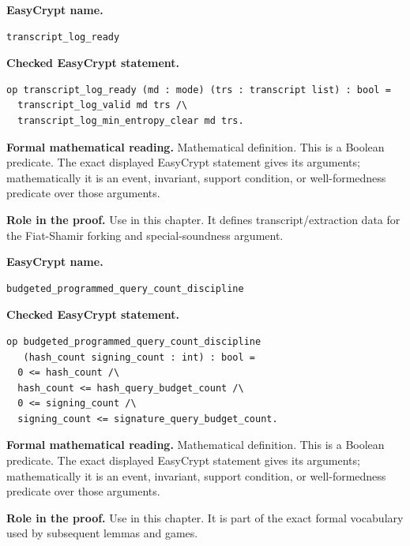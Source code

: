 \begin{formaldefinition}
\noindent\textbf{EasyCrypt name.}
\begin{lstlisting}[language=EasyCrypt,basicstyle=\ttfamily\scriptsize]
transcript_log_ready
\end{lstlisting}
\noindent\textbf{Checked EasyCrypt statement.}
\begin{lstlisting}[language=EasyCrypt,basicstyle=\ttfamily\scriptsize]
op transcript_log_ready (md : mode) (trs : transcript list) : bool =
  transcript_log_valid md trs /\
  transcript_log_min_entropy_clear md trs.
\end{lstlisting}
\noindent\textbf{Formal mathematical reading.}
Mathematical definition. This is a Boolean predicate.  The exact displayed EasyCrypt statement gives its arguments; mathematically it is an event, invariant, support condition, or well-formedness predicate over those arguments.

\noindent\textbf{Role in the proof.}
Use in this chapter. It defines transcript/extraction data for the Fiat-Shamir forking and special-soundness argument.

\end{formaldefinition}

\begin{formaldefinition}
\noindent\textbf{EasyCrypt name.}
\begin{lstlisting}[language=EasyCrypt,basicstyle=\ttfamily\scriptsize]
budgeted_programmed_query_count_discipline
\end{lstlisting}
\noindent\textbf{Checked EasyCrypt statement.}
\begin{lstlisting}[language=EasyCrypt,basicstyle=\ttfamily\scriptsize]
op budgeted_programmed_query_count_discipline
   (hash_count signing_count : int) : bool =
  0 <= hash_count /\
  hash_count <= hash_query_budget_count /\
  0 <= signing_count /\
  signing_count <= signature_query_budget_count.
\end{lstlisting}
\noindent\textbf{Formal mathematical reading.}
Mathematical definition. This is a Boolean predicate.  The exact displayed EasyCrypt statement gives its arguments; mathematically it is an event, invariant, support condition, or well-formedness predicate over those arguments.

\noindent\textbf{Role in the proof.}
Use in this chapter. It is part of the exact formal vocabulary used by subsequent lemmas and games.

\end{formaldefinition}

